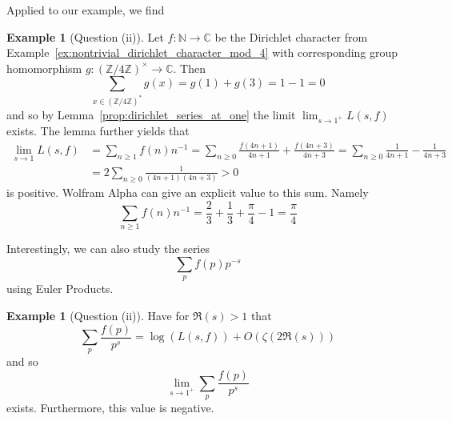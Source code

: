 \documentclass{scrartcl}
\newcommand{\N}{\mathbb{N}}
\newcommand{\Z}{\mathbb{Z}}
\newcommand{\C}{\mathbb{C}}
\newcommand{\units}{\times}
\theoremstyle{definition}
\newtheorem{example}[definition]{Example}
\begin{document}
Applied to our example, we find
\begin{example}[Question (ii)]
    \label{ex:l_series_mod_4}
    Let $f: \N \to \C$ be the Dirichlet character from Example~\ref{ex:nontrivial_dirichlet_character_mod_4} with corresponding group homomorphism $g: (\Z/4\Z)^\units \to \C$.
    Then
    \begin{equation*}
        \sum_{x \in (\Z/4\Z)^*} g(x) = g(1) + g(3) = 1 - 1 = 0
    \end{equation*}
    and so by Lemma~\ref{prop:dirichlet_series_at_one} the limit $\lim_{s \to 1^+} L(s, f)$ exists.
    The lemma further yields that
    \begin{align*}
        \lim_{s \to 1} L(s, f) &= \sum_{n \geq 1} f(n) n^{-1} = \sum_{n \geq 0} \frac {f(4n + 1)} {4n + 1} + \frac {f(4n + 3)} {4n + 3} = \sum_{n \geq 0} \frac 1 {4n + 1} - \frac 1 {4n + 3} \\
        &= 2 \sum_{n \geq 0} \frac 1 {(4n + 1)(4n + 3)} > 0
    \end{align*}
    is positive. 
    Wolfram Alpha \cite{wolfram_alpha} can give an explicit value to this sum. Namely
    \begin{equation*}
        \sum_{n \geq 1} f(n) n^{-1} = \frac 2 3 + \frac 1 3 + \frac \pi 4 - 1 = \frac \pi 4
    \end{equation*}
\end{example}
Interestingly, we can also study the series
\begin{equation*}
    \sum_p f(p) p^{-s}
\end{equation*}
using Euler Products.
\begin{example}[Question (ii)]
    \label{ex:dirichlet_sum_over_primes}
    Have for $\Re(s) > 1$ that
    \begin{equation*}
        \sum_p \frac {f(p)} {p^s} = \log( L(s, f) ) + O( \zeta(2\Re(s)) )
    \end{equation*}
    and so
    \begin{equation*}
        \lim_{s \to 1^+} \sum_p \frac {f(p)} {p^s}
    \end{equation*}
    exists. Furthermore, this value is negative.
\end{example}
\end{document}
